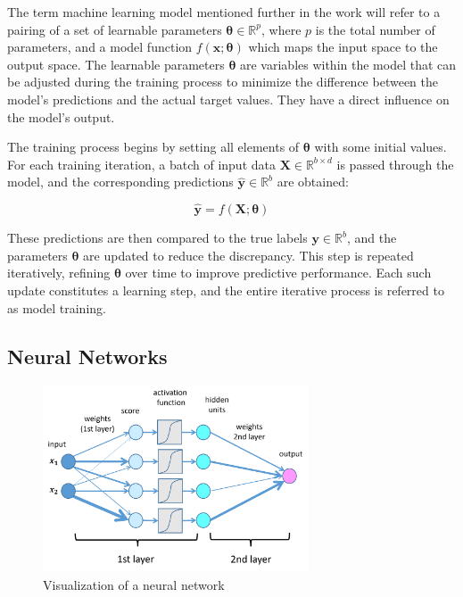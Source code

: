 \documentclass{pracalicmgr}
\begin{document}
The term machine learning model mentioned further in the work will refer to a pairing of a set of learnable parameters \( \boldsymbol{\theta} \in \mathbb{R}^p \), where \( p \) is the total number of parameters, and a model function \( f(\mathbf{x}; \boldsymbol{\theta}) \) which maps the input space to the output space. The learnable parameters \( \boldsymbol{\theta} \) are variables within the model that can be adjusted during the training process to minimize the difference between the model's predictions and the actual target values. They have a direct influence on the model's output.


The training process begins by setting all elements of \( \boldsymbol{\theta} \) with some initial values. For each training iteration, a batch of input data \( \mathbf{X} \in \mathbb{R}^{b \times d} \) is passed through the model, and the corresponding predictions \( \hat{\mathbf{y}} \in \mathbb{R}^b \) are obtained:

\[
\hat{\mathbf{y}} = f(\mathbf{X}; \boldsymbol{\theta})
\]

These predictions are then compared to the true labels \( \mathbf{y} \in \mathbb{R}^b \), and the parameters \( \boldsymbol{\theta} \) are updated to reduce the discrepancy. This step is repeated iteratively, refining \( \boldsymbol{\theta} \) over time to improve predictive performance. Each such update constitutes a learning step, and the entire iterative process is referred to as model training.

\subsection{Neural Networks}

\begin{figure}[H]
\centering
\includegraphics[width=0.7\textwidth]{src/deepNet.png}
\caption{Visualization of a neural network \cite{deepLearningRoundup2025}}
\label{fig:deepN}
\end{figure}
\end{document}
